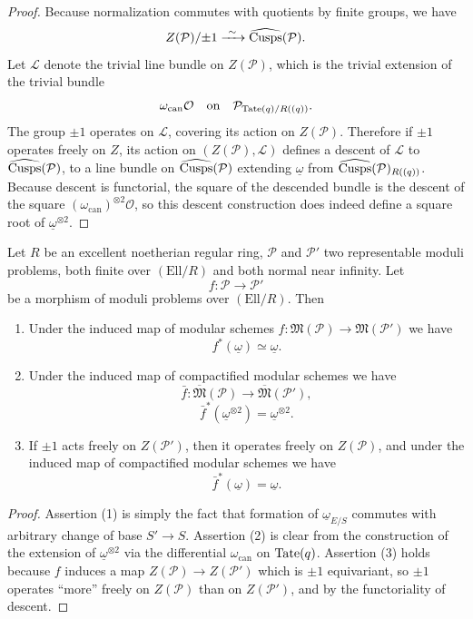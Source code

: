 \begin{proof}
Because normalization commutes with quotients by finite groups, we have
\[
Z(\mathcal{P})/{\pm 1} \xrightarrow{\ \sim\ } \widehat{\operatorname{Cusps}}(\mathcal{P}) .
\]
Let $\mathcal{L}$ denote the trivial line bundle on $Z(\mathcal{P})$, which is the trivial extension of the trivial bundle
\[
\omega_{\mathrm{can}}\mathcal{O} \quad\text{on}\quad \mathcal{P}_{\mathrm{Tate}(q)/R((q))} .
\]
The group $\pm 1$ operates on $\mathcal{L}$, covering its action on $Z(\mathcal{P})$. Therefore if $\pm 1$ operates freely on $Z$, its action on $(Z(\mathcal{P}), \mathcal{L})$ defines a descent of $\mathcal{L}$ to $\widehat{\operatorname{Cusps}}(\mathcal{P})$, to a line bundle on $\widehat{\operatorname{Cusps}}(\mathcal{P})$ extending $\underline{\omega}$ from $\widehat{\operatorname{Cusps}}(\mathcal{P})_{R((q))}$. Because descent is functorial, the square of the descended bundle is the descent of the square $(\omega_{\mathrm{can}})^{\otimes 2}\mathcal{O}$, so this descent construction does indeed define a square root of $\underline{\omega}^{\otimes 2}$.
\end{proof}

\begin{kprop}\label{prop:10.13.5}
Let $R$ be an excellent noetherian regular ring, $\mathcal{P}$ and $\mathcal{P}'$ two representable moduli problems, both finite over $(\mathrm{Ell}/R)$ and both normal near infinity. Let
\[
f : \mathcal{P} \to \mathcal{P}'
\]
be a morphism of moduli problems over $(\mathrm{Ell}/R)$. Then
\begin{enumerate}[label=(\arabic*)]
\item Under the induced map of modular schemes $f : \mathfrak{M}(\mathcal{P}) \to \mathfrak{M}(\mathcal{P}')$ we have
\[
f^*(\underline{\omega}) \simeq \underline{\omega} .
\]
\item Under the induced map of compactified modular schemes we have
\[
\bar{f} : \overline{\mathfrak{M}}(\mathcal{P}) \to \overline{\mathfrak{M}}(\mathcal{P}') ,
\]
\[
\bar{f}^*(\underline{\omega}^{\otimes 2}) = \underline{\omega}^{\otimes 2} .
\]
\item If $\pm 1$ acts freely on $Z(\mathcal{P}')$, then it operates freely on $Z(\mathcal{P})$, and under the induced map of compactified modular schemes we have
\[
\bar{f}^*(\underline{\omega}) = \underline{\omega} .
\]
\end{enumerate}
\end{kprop}

\begin{proof}
Assertion (1) is simply the fact that formation of $\underline{\omega}_{E/S}$ commutes with arbitrary change of base $S' \to S$. Assertion (2) is clear from the construction of the extension of $\underline{\omega}^{\otimes 2}$ via the differential $\omega_{\mathrm{can}}$ on $\mathrm{Tate}(q)$. Assertion (3) holds because $f$ induces a map $Z(\mathcal{P}) \to Z(\mathcal{P}')$ which is $\pm 1$ equivariant, so $\pm 1$ operates ``more'' freely on $Z(\mathcal{P})$ than on $Z(\mathcal{P}')$, and by the functoriality of descent.
\end{proof}

